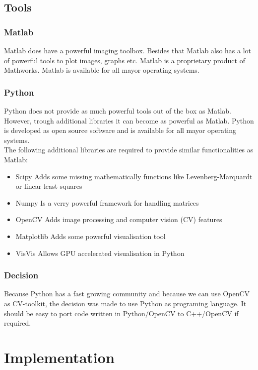 \documentclass[11pt,a4paper,titlepage,oneside]{report}
\begin{document}
\section{Tools}
\subsection{Matlab}
Matlab does have a powerful imaging toolbox. Besides that Matlab also has a lot of powerful tools to plot images, graphs etc. Matlab is a proprietary product of Mathworks. Matlab is available for all mayor operating systems.

\subsection{Python}
Python does not provide as much powerful tools out of the box as Matlab. However, trough additional libraries it can become as powerful as Matlab. Python is developed as open source software and is available for all mayor operating systems.\\
The following additional libraries are required to provide similar functionalities as Matlab:
\begin{itemize}
  \item Scipy
    \subitem Adds some missing mathematically functions like Levenberg-Marquardt or linear least squares
  \item Numpy
    \subitem Is a verry powerful framework for handling matrices
  \item OpenCV
		\subitem Adds image processing and computer vision (CV) features
  \item Matplotlib
    \subitem Adds some powerful visualisation tool
  \item VisVis
    \subitem Allows GPU accelerated visualisation in Python
\end{itemize}

\subsection{Decision}
Because Python has a fast growing community and because we can use OpenCV as CV-toolkit, the decision was made to use Python as programing language. It should be easy to port code written in Python/OpenCV to C++/OpenCV if required.

\chapter{Implementation}\label{chap:implementation}
\end{document}
